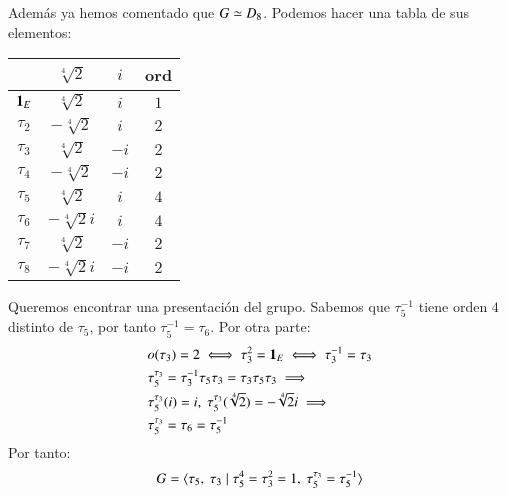\begin{eg}
    Además ya hemos comentado que $G \simeq D_8$. Podemos hacer una tabla de sus elementos:\\
    \begin{center}
        \begin{tabular}{|c||c|c|c|}
        \hline
                 & $\sqrt[4]{2}$   & $i$  & ord \\ \hline \hline
        $\mathbf{1}_E$     & $\sqrt[4]{2}$   & $i$  & $1$ \\ \hline
        $\tau_2$ & $-\sqrt[4]{2}$  & $i$  & $2$ \\ \hline
        $\tau_3$ & $\sqrt[4]{2}$   & $-i$ & $2$ \\ \hline
        $\tau_4$ & $-\sqrt[4]{2}$  & $-i$ & $2$ \\ \hline
        $\tau_5$ & $\sqrt[4]{2}$   & $i$  & $4$ \\ \hline
        $\tau_6$ & $-\sqrt[4]{2}i$ & $i$  & $4$ \\ \hline
        $\tau_7$ & $\sqrt[4]{2}$   & $-i$ & $2$ \\ \hline
        $\tau_8$ & $-\sqrt[4]{2}i$ & $-i$ & $2$ \\ \hline
        \end{tabular}
    \end{center}

Queremos encontrar una presentación del grupo. Sabemos que $\tau_5^{-1}$ tiene orden $4$ distinto de $\tau_5$, por tanto $\tau_5^{-1} = \tau_6$. Por otra parte:
\begin{align*}
    &o(\tau_3) = 2 \iff \tau_3^2 = \mathbf{1}_E \iff \tau_3^{-1} = \tau_3\\
    &\tau_5^{\tau_3} = \tau_3^{-1}\tau_5\tau_3 = \tau_3\tau_5\tau_3 \implies \\
    &\tau_5^{\tau_3}(i) = i,\ \tau_5^{\tau_3}(\sqrt[4]{2}) = -\sqrt[4]{2}i \implies\\
    &\tau_5^{\tau_3} = \tau_6 = \tau_5^{-1}
\end{align*}
Por tanto:
$$
    G = \langle\tau_5,\ \tau_3 \mid \tau_5^4 = \tau_3^2 = 1,\ \tau_5^{\tau_3} = \tau_5^{-1} \rangle
$$
\end{eg}
